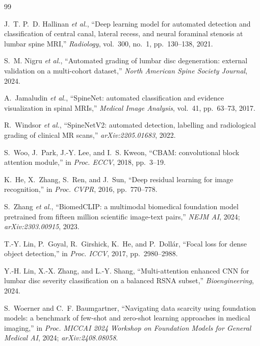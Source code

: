 \documentclass[conference]{IEEEtran}
\begin{document}
\begin{thebibliography}{99}
\small

J.~T. P.~D. Hallinan \textit{et al.},
``Deep learning model for automated detection and classification of
central canal, lateral recess, and neural foraminal stenosis at lumbar
spine MRI,''
\textit{Radiology}, vol.~300, no.~1, pp.~130--138, 2021.

S.~M. Nigru \textit{et al.},
``Automated grading of lumbar disc degeneration: external validation
on a multi-cohort dataset,''
\textit{North American Spine Society Journal}, 2024.

A.~Jamaludin \textit{et al.},
``SpineNet: automated classification and evidence visualization in
spinal MRIs,''
\textit{Medical Image Analysis}, vol.~41, pp.~63--73, 2017.

R.~Windsor \textit{et al.},
``SpineNetV2: automated detection, labelling and radiological grading
of clinical MR scans,''
\textit{arXiv:2205.01683}, 2022.

S.~Woo, J.~Park, J.-Y. Lee, and I.~S. Kweon,
``CBAM: convolutional block attention module,''
in \textit{Proc. ECCV}, 2018, pp.~3--19.

K.~He, X.~Zhang, S.~Ren, and J.~Sun,
``Deep residual learning for image recognition,''
in \textit{Proc. CVPR}, 2016, pp.~770--778.

S.~Zhang \textit{et al.},
``BiomedCLIP: a multimodal biomedical foundation model pretrained from
fifteen million scientific image-text pairs,''
\textit{NEJM AI}, 2024;\newline
\textit{arXiv:2303.00915}, 2023.

T.-Y. Lin, P.~Goyal, R.~Girshick, K.~He, and P.~Doll\'ar,
``Focal loss for dense object detection,''
in \textit{Proc. ICCV}, 2017, pp.~2980--2988.

Y.-H. Lin, X.-X. Zhang, and L.-Y. Shang,
``Multi-attention enhanced CNN for lumbar disc severity classification
on a balanced RSNA subset,''
\textit{Bioengineering}, 2024.

S.~Woerner and C.~F. Baumgartner,
``Navigating data scarcity using foundation models: a benchmark of
few-shot and zero-shot learning approaches in medical imaging,''
in \textit{Proc. MICCAI 2024 Workshop on Foundation Models for
General Medical AI}, 2024;\newline
\textit{arXiv:2408.08058}.


\end{thebibliography}
\end{document}
